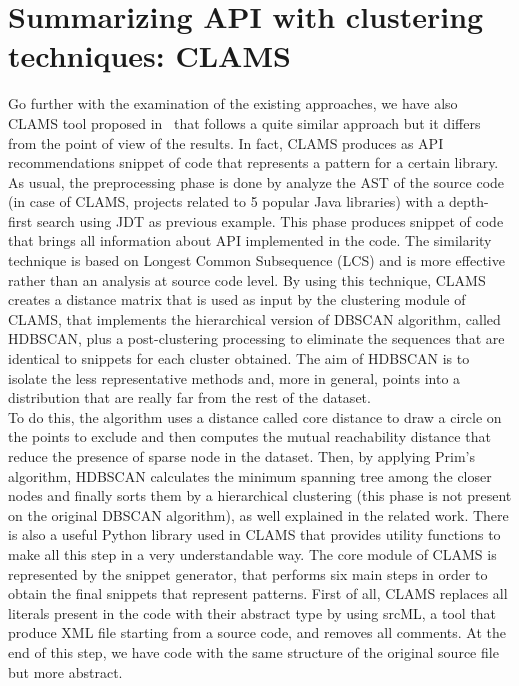  


\section{Summarizing API with clustering techniques: CLAMS}
Go further with the examination of the existing approaches, we have also CLAMS tool proposed in~\cite{katirtzis_summarizing_2018} that follows a quite similar approach but it differs from the point of view of the results. In fact, CLAMS produces as API recommendations snippet of code that represents a pattern for a certain library. As usual, the preprocessing phase is done by analyze the AST of the source code (in case of CLAMS, projects related to 5 popular Java libraries) with a depth-first search using JDT as previous example. This phase produces snippet of code that brings all information about API implemented in the code. The similarity technique is based on Longest Common Subsequence (LCS) and is more effective rather than an analysis at source code level. By using this technique, CLAMS creates a distance matrix that is used as input by the clustering module of CLAMS, that implements the hierarchical version of DBSCAN algorithm, called HDBSCAN, plus a post-clustering processing to eliminate the sequences that are identical to snippets for each cluster obtained. The aim of HDBSCAN is to isolate the less representative methods and, more in general, points into a distribution that are really far from the rest of the dataset. \\
To do this, the algorithm uses a distance called core distance to draw a circle on the points to exclude and then computes the mutual reachability distance that reduce the presence of sparse node in the dataset. Then, by applying Prim's algorithm, HDBSCAN calculates the minimum spanning tree among the closer nodes and finally sorts them by a hierarchical clustering (this phase is not present on the original DBSCAN algorithm), as well explained in the related work. There is also a useful Python library used in CLAMS that provides utility functions to make all this step in a very understandable way. The core module of CLAMS is represented by the snippet generator, that performs six main steps in order to obtain the final snippets that represent patterns. First of all, CLAMS replaces all literals present in the code with their abstract type by using srcML, a tool that produce XML file starting from a source code, and removes all comments. At the end of this step, we have code with the same structure of the original source file but more abstract.\\

